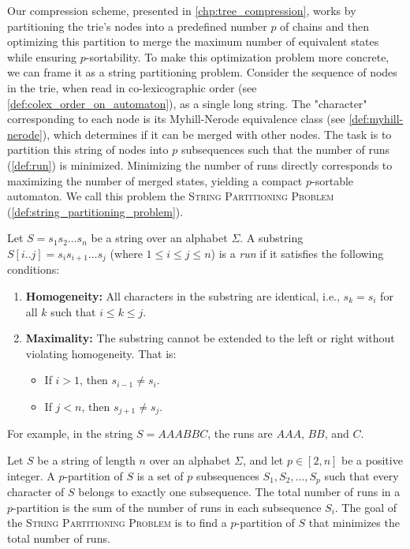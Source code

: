 Our compression scheme, presented in \cref{chp:tree_compression}, works by partitioning the trie's nodes into a predefined number $p$ of chains and then optimizing this partition to merge the maximum number of equivalent states while ensuring $p$-sortability. To make this optimization problem more concrete, we can frame it as a string partitioning problem. Consider the sequence of nodes in the trie, when read in co-lexicographic order (see \cref{def:colex_order_on_automaton}), as a single long string. The "character" corresponding to each node is its Myhill-Nerode equivalence class (see \cref{def:myhill-nerode}), which determines if it can be merged with other nodes. The task is to partition this string of nodes into $p$ subsequences such that the number of runs (\cref{def:run}) is minimized. Minimizing the number of runs directly corresponds to maximizing the number of merged states, yielding a compact $p$-sortable automaton. We call this problem the \textsc{String Partitioning Problem} (\cref{def:string_partitioning_problem}).

\begin{definition}[Run]
    \label{def:run}
    Let $S = s_1s_2\ldots s_n$ be a string over an alphabet $\Sigma$. A substring $S[i..j] = s_i s_{i+1} \ldots s_j$ (where $1 \le i \le j \le n$) is a \textit{run} if it satisfies the following conditions:
    \begin{enumerate}
        \item \textbf{Homogeneity:} All characters in the substring are identical, i.e., $s_k = s_i$ for all $k$ such that $i \le k \le j$.
        \item \textbf{Maximality:} The substring cannot be extended to the left or right without violating homogeneity. That is:
        \begin{itemize}
            \item If $i > 1$, then $s_{i-1} \neq s_i$.
            \item If $j < n$, then $s_{j+1} \neq s_j$.
        \end{itemize}
    \end{enumerate}
\end{definition}

\begin{example}[Run]
    For example, in the string $S = AAABBC$, the runs are $AAA$, $BB$, and $C$.
\end{example}

\begin{definition}
    \label{def:string_partitioning_problem}
    Let $S$ be a string of length $n$ over an alphabet $\Sigma$, and let $p\in[2,n]$ be a positive integer. A $p$-partition of $S$ is a set of $p$ subsequences $S_1, S_2, \ldots, S_p$ such that every character of $S$ belongs to exactly one subsequence. The total number of runs in a $p$-partition is the sum of the number of runs in each subsequence $S_i$. The goal of the \textsc{String Partitioning Problem} is to find a $p$-partition of $S$ that minimizes the total number of runs.
\end{definition}

